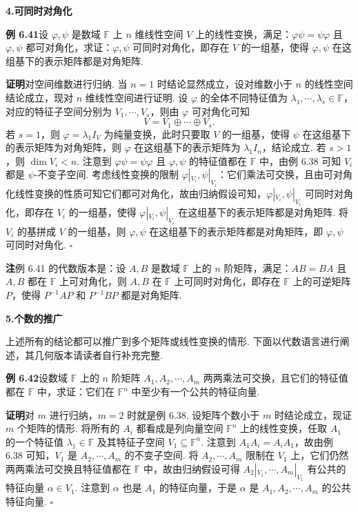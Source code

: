 \documentclass[UTF8,12pt,a4paper,fontset=fandol]{ctexart}
\begin{document}
\noindent\textbf{4.\quad 可同时对角化}

\noindent\textbf{例 6.41}\quad 设 $\varphi,\psi$ 是数域 $\mathbb{F}$ 上 $n$ 维线性空间 $V$ 上的线性变换，满足：$\varphi\psi=\psi\varphi$ 且 $\varphi,\psi$ 都可对角化，求证：$\varphi,\psi$ 可同时对角化，即存在 $V$ 的一组基，使得 $\varphi,\psi$ 在这组基下的表示矩阵都是对角矩阵.

\noindent\textbf{证明}\quad 对空间维数进行归纳. 当 $n=1$ 时结论显然成立，设对维数小于 $n$ 的线性空间结论成立，现对 $n$ 维线性空间进行证明. 设 $\varphi$ 的全体不同特征值为 $\lambda_1,\cdots,\lambda_s\in\mathbb{F}$，对应的特征子空间分别为 $V_1,\cdots,V_s$，则由 $\varphi$ 可对角化可知
\[
V=V_1\oplus\cdots\oplus V_s.
\]
若 $s=1$，则 $\varphi=\lambda_1I_V$ 为纯量变换，此时只要取 $V$ 的一组基，使得 $\psi$ 在这组基下的表示矩阵为对角矩阵，则 $\varphi$ 在这组基下的表示矩阵为 $\lambda_1I_n$，结论成立. 若 $s>1$，则 $\dim V_i<n$. 注意到 $\varphi\psi=\psi\varphi$ 且 $\varphi,\psi$ 的特征值都在 $\mathbb{F}$ 中，由例 6.38 可知 $V_i$ 都是 $\psi$-不变子空间. 考虑线性变换的限制 $\varphi|_{V_i},\psi|_{V_i}$：它们乘法可交换，且由可对角化线性变换的性质可知它们都可对角化，故由归纳假设可知，$\varphi|_{V_i},\psi|_{V_i}$ 可同时对角化，即存在 $V_i$ 的一组基，使得 $\varphi|_{V_i},\psi|_{V_i}$ 在这组基下的表示矩阵都是对角矩阵. 将 $V_i$ 的基拼成 $V$ 的一组基，则 $\varphi,\psi$ 在这组基下的表示矩阵都是对角矩阵，即 $\varphi,\psi$ 可同时对角化. $\square$

\noindent\textbf{注}\quad 例 6.41 的代数版本是：设 $A,B$ 是数域 $\mathbb{F}$ 上的 $n$ 阶矩阵，满足：$AB=BA$ 且 $A,B$ 都在 $\mathbb{F}$ 上可对角化，则 $A,B$ 在 $\mathbb{F}$ 上可同时对角化，即存在 $\mathbb{F}$ 上的可逆矩阵 $P$，使得 $P^{-1}AP$ 和 $P^{-1}BP$ 都是对角矩阵.

\noindent\textbf{5.\quad 个数的推广}

上述所有的结论都可以推广到多个矩阵或线性变换的情形. 下面以代数语言进行阐述，其几何版本请读者自行补充完整.

\noindent\textbf{例 6.42}\quad 设数域 $\mathbb{F}$ 上的 $n$ 阶矩阵 $A_1,A_2,\cdots,A_m$ 两两乘法可交换，且它们的特征值都在 $\mathbb{F}$ 中，求证：它们在 $\mathbb{F}^n$ 中至少有一个公共的特征向量.

\noindent\textbf{证明}\quad 对 $m$ 进行归纳，$m=2$ 时就是例 6.38. 设矩阵个数小于 $m$ 时结论成立，现证 $m$ 个矩阵的情形. 将所有的 $A_i$ 都看成是列向量空间 $\mathbb{F}^n$ 上的线性变换，任取 $A_1$ 的一个特征值 $\lambda_1\in\mathbb{F}$ 及其特征子空间 $V_1\subseteq\mathbb{F}^n$. 注意到 $A_1A_i=A_iA_1$，故由例 6.38 可知，$V_1$ 是 $A_2,\cdots,A_m$ 的不变子空间. 将 $A_2,\cdots,A_m$ 限制在 $V_1$ 上，它们仍然两两乘法可交换且特征值都在 $\mathbb{F}$ 中，故由归纳假设可得 $A_2|_{V_1},\cdots,A_m|_{V_1}$ 有公共的特征向量 $\alpha\in V_1$. 注意到 $\alpha$ 也是 $A_1$ 的特征向量，于是 $\alpha$ 是 $A_1,A_2,\cdots,A_m$ 的公共特征向量. $\square$
\end{document}
